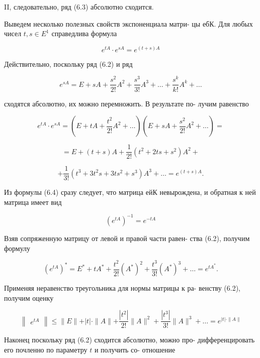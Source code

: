 \documentclass[8pt]{extarticle}
\begin{document}
II, следовательно, ряд (6.3) абсолютно сходится.

Выведем несколько полезных свойств экспоненциала матри- цы ебК. Для любых чисел \(t,s \in  {E}^{1}\) справедлива формула

\[
{e}^{tA} \cdot  {e}^{sA} = {e}^{\left( {t + s}\right) A} \tag{6.4}
\]

Действительно, поскольку ряд (6.2) и ряд

\[
{e}^{sA} = E + {sA} + \frac{{s}^{2}}{2!}{A}^{2} + \frac{{s}^{3}}{3!}{A}^{3} + \ldots  + \frac{{s}^{k}}{k!}{A}^{k} + \ldots
\]

сходятся абсолютно, их можно перемножить. В результате по- лучим равенство

\[
{e}^{tA} \cdot  {e}^{sA} = \left( {E + {tA} + \frac{{t}^{2}}{2!}{A}^{2} + \ldots }\right) \left( {E + {sA} + \frac{{s}^{2}}{2!}{A}^{2} + \ldots }\right)  =
\]

\[
= E + \left( {t + s}\right) A + \frac{1}{2!}\left( {{t}^{2} + {2ts} + {s}^{2}}\right) {A}^{2} +
\]

\[
+ \frac{1}{3!}\left( {{t}^{3} + 3{t}^{2}s + {3t}{s}^{2} + {s}^{3}}\right) {A}^{3} + \ldots  = {e}^{\left( {t + s}\right) A}.
\]

Из формулы (6.4) сразу следует, что матрица ейК невырождена, и обратная к ней матрица имеет вид

\[
{\left( {e}^{tA}\right) }^{-1} = {e}^{-{tA}}
\]

Взяв сопряженную матрицу от левой и правой части равен- ства (6.2), получим формулу

\[
{\left( {e}^{tA}\right) }^{ * } = {E}^{ * } + t{A}^{ * } + \frac{{t}^{2}}{2!}{\left( {A}^{ * }\right) }^{2} + \frac{{t}^{3}}{3!}{\left( {A}^{ * }\right) }^{3} + \ldots  = {e}^{t{A}^{ * }}.
\]

Применяя неравенство треугольника для нормы матрицы к ра- венству (6.2), получим оценку

\[
\left\lVert \begin{array}{c} {e}^{tA} \end{array} \right\rVert \leq  \parallel E\parallel  + \left| t\right|  \cdot  \parallel A\parallel  + \frac{\left| {t}^{2}\right| }{2!}\parallel A{\parallel }^{2} + \frac{\left| {t}^{3}\right| }{3!}\parallel A{\parallel }^{3} + \ldots  = {e}^{\left| t\right|  \cdot  \parallel A\parallel }
\]

Наконец поскольку ряд (6.2) сходится абсолютно, можно про- дифференцировать его почленно по параметру \(t\) и получить со- отношение
\end{document}
